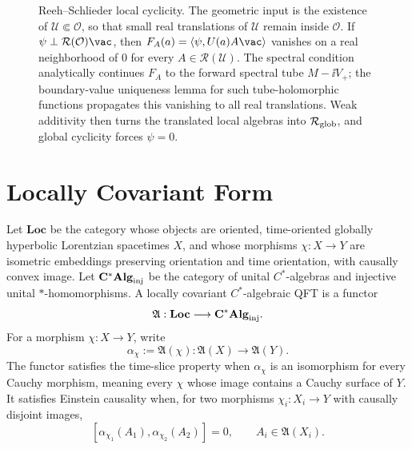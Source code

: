 \begin{figure}[H]
{
  }
  \caption{Reeh--Schlieder local cyclicity.  The geometric input is the
  existence of \(\mathcal U\Subset\mathcal O\), so that small real
  translations of \(\mathcal U\) remain inside \(\mathcal O\).  If
  \(\psi\perp\mathcal R(\mathcal O)\vac\), then
  \(F_A(a)=\langle\psi,U(a)A\vac\rangle\) vanishes on a real neighborhood of
  \(0\) for every \(A\in\mathcal R(\mathcal U)\).  The spectral condition
  analytically continues \(F_A\) to the forward spectral tube
  \(M-\ii V_+\); the boundary-value
  uniqueness lemma for such tube-holomorphic functions propagates this
  vanishing to all real translations.  Weak additivity then turns the
  translated local algebras into \(\mathcal R_{\rm glob}\), and global
  cyclicity forces \(\psi=0\).}
  \label{fig:reeh-schlieder-cyclicity}
\end{figure}

\section{Locally Covariant Form}

\begin{definition}
\label{def:locally-covariant-qft-functor}
Let \(\mathbf{Loc}\) be the category whose objects are oriented,
time-oriented globally hyperbolic Lorentzian spacetimes \(X\), and whose
morphisms \(\chi:X\to Y\) are isometric embeddings preserving orientation and
time orientation, with causally convex image.  Let \(\mathbf{C^*Alg}_{\rm inj}\)
be the category of unital \(C^*\)-algebras and injective unital
\(*\)-homomorphisms.  A locally covariant \(C^*\)-algebraic QFT is a functor
\[
  \mathfrak A:\mathbf{Loc}\longrightarrow\mathbf{C^*Alg}_{\rm inj}.
\]
For a morphism \(\chi:X\to Y\), write
\[
  \alpha_\chi:=\mathfrak A(\chi):\mathfrak A(X)\to\mathfrak A(Y).
\]
The functor satisfies the time-slice property when \(\alpha_\chi\) is an
isomorphism for every Cauchy morphism, meaning every \(\chi\) whose image
contains a Cauchy surface of \(Y\).  It satisfies Einstein causality when, for
two morphisms \(\chi_i:X_i\to Y\) with causally disjoint images,
\[
  [\alpha_{\chi_1}(A_1),\alpha_{\chi_2}(A_2)]=0,
  \qquad
  A_i\in\mathfrak A(X_i).
\]
\end{definition}

